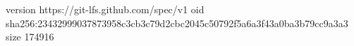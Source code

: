 version https://git-lfs.github.com/spec/v1
oid sha256:23432999037873958c3cb3c79d2cbc2045c50792f5a6a3f43a0ba3b79cc9a3a3
size 174916

